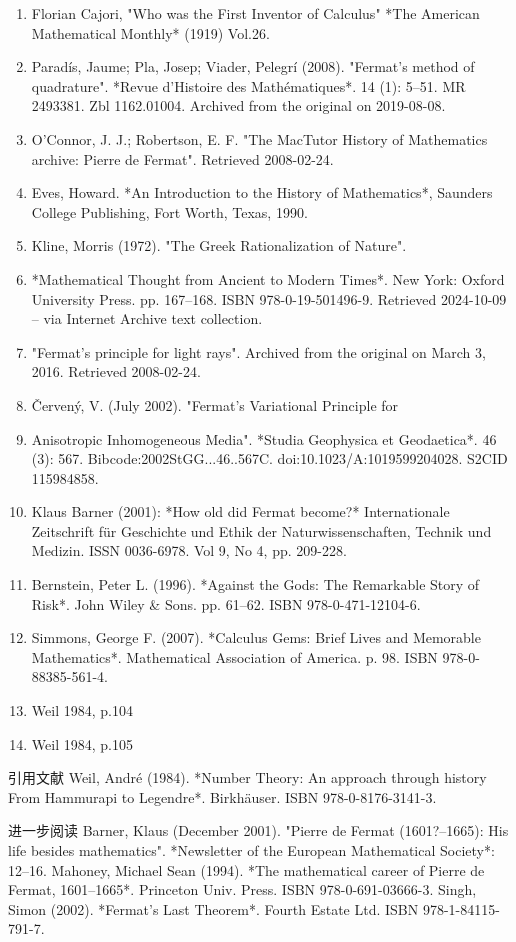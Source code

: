 \begin{enumerate}
\item Florian Cajori, "Who was the First Inventor of Calculus" *The American Mathematical Monthly* (1919) Vol.26.  
\item Paradís, Jaume; Pla, Josep; Viader, Pelegrí (2008). "Fermat's method of quadrature". *Revue d'Histoire des Mathématiques*. 14 (1): 5–51. MR 2493381. Zbl 1162.01004. Archived from the original on 2019-08-08.  
\item O'Connor, J. J.; Robertson, E. F. "The MacTutor History of Mathematics archive: Pierre de Fermat". Retrieved 2008-02-24.  
\item Eves, Howard. *An Introduction to the History of Mathematics*, Saunders College Publishing, Fort Worth, Texas, 1990.  
\item Kline, Morris (1972). "The Greek Rationalization of Nature". \item *Mathematical Thought from Ancient to Modern Times*. New York: Oxford University Press. pp. 167–168. ISBN 978-0-19-501496-9. Retrieved 2024-10-09 – via Internet Archive text collection.  
\item "Fermat's principle for light rays". Archived from the original on March 3, 2016. Retrieved 2008-02-24.  
\item Červený, V. (July 2002). "Fermat's Variational Principle for \item Anisotropic Inhomogeneous Media". *Studia Geophysica et Geodaetica*. 46 (3): 567. Bibcode:2002StGG...46..567C. doi:10.1023/A:1019599204028. S2CID 115984858.  
\item Klaus Barner (2001): *How old did Fermat become?* Internationale Zeitschrift für Geschichte und Ethik der Naturwissenschaften, Technik und Medizin. ISSN 0036-6978. Vol 9, No 4, pp. 209-228.  
\item Bernstein, Peter L. (1996). *Against the Gods: The Remarkable Story of Risk*. John Wiley & Sons. pp. 61–62. ISBN 978-0-471-12104-6.  
\item Simmons, George F. (2007). *Calculus Gems: Brief Lives and Memorable Mathematics*. Mathematical Association of America. p. 98. ISBN 978-0-88385-561-4.  
\item Weil 1984, p.104  
\item Weil 1984, p.105
\end{enumerate}
引用文献  
Weil, André (1984). *Number Theory: An approach through history From Hammurapi to Legendre*. Birkhäuser. ISBN 978-0-8176-3141-3.

进一步阅读  
Barner, Klaus (December 2001). "Pierre de Fermat (1601?–1665): His life besides mathematics". *Newsletter of the European Mathematical Society*: 12–16.  
Mahoney, Michael Sean (1994). *The mathematical career of Pierre de Fermat, 1601–1665*. Princeton Univ. Press. ISBN 978-0-691-03666-3.  
Singh, Simon (2002). *Fermat's Last Theorem*. Fourth Estate Ltd. ISBN 978-1-84115-791-7.